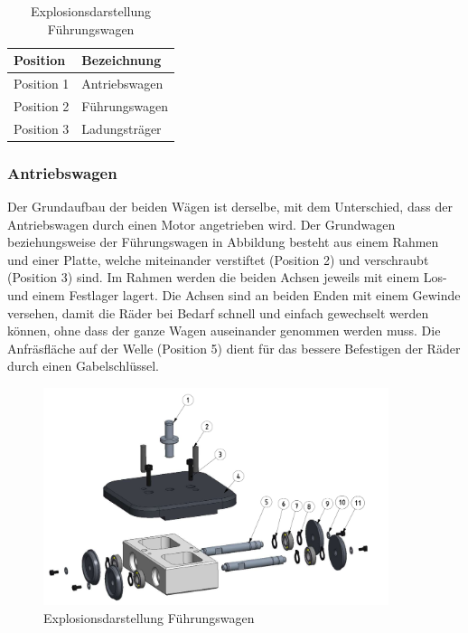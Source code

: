 \documentclass[../../main.tex]{subfiles}
\begin{document}
    \begin{table}[H] \centering
        \begin{tabular}{|l|l|}
        \hline
        \textbf{Position} & \textbf{Bezeichnung}\\
        \hline
        Position 1          & Antriebswagen\\
         \hline
        Position 2          & Führungswagen\\
        \hline
        Position 3          & Ladungsträger\\
        \hline
        \end{tabular}

    \subsubsection{Antriebswagen}
    Der Grundaufbau der beiden Wägen ist derselbe, mit dem Unterschied, dass der Antriebswagen durch einen Motor angetrieben wird. Der Grundwagen beziehungsweise der Führungswagen in Abbildung besteht aus einem Rahmen und einer Platte, welche miteinander verstiftet (Position 2) und verschraubt (Position 3) sind. Im Rahmen werden die beiden Achsen jeweils mit einem Los- und einem Festlager lagert. Die Achsen sind an beiden Enden mit einem Gewinde versehen, damit die Räder bei Bedarf schnell und einfach gewechselt werden können, ohne dass der ganze Wagen auseinander genommen werden muss. Die Anfräsfläche auf der Welle (Position 5) dient für das bessere Befestigen der Räder durch einen Gabelschlüssel.

     \begin{figure}[H] %
        \centering
        \includegraphics[width=0.9\textwidth]{Fuehrungswagen.png}
        \caption{Explosionsdarstellung Führungswagen}
        \label{fig:expl_fuehrungswagen}
    \end{figure}   


\end{table}
\end{document}
